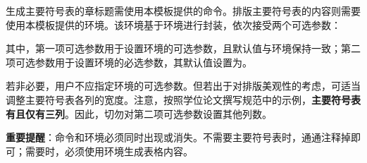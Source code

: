 \documentclass[doctor, vlined, ]{DissertUESTC}
\begin{document}
	

	
	\tableofcontents
	

	\listoffigures
	

	\listoftables
	

	\listofsymbs  %
	
	生成主要符号表的章标题需使用本模板提供的命令。排版主要符号表的内容则需要使用本模板提供的环境。该环境基于环境进行封装，依次接受两个可选参数：
	
	
	\noindent 其中，第一项可选参数用于设置环境的可选参数，且默认值与环境保持一致；第二项可选参数用于设置环境的必选参数，其默认值设置为。
	
	若非必要，用户不应指定环境的可选参数。但若出于对排版美观性的考虑，可适当调整主要符号表各列的宽度。注意，按照学位论文撰写规范中的示例，\textbf{主要符号表有且仅有三列}。因此，切勿对第二项可选参数设置其他列数。
	
	\textbf{重要提醒}：命令和环境必须同时出现或消失。不需要主要符号表时，通通注释掉即可；需要时，必须使用环境生成表格内容。
	
\end{document}
